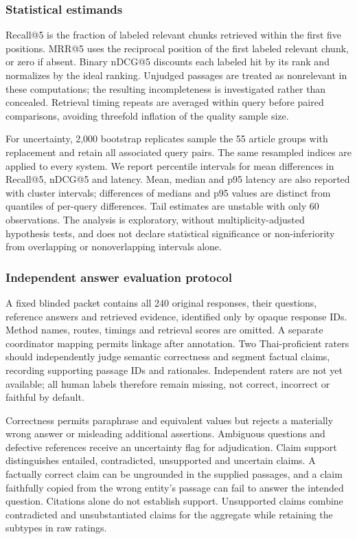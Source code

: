 \hypertarget{statistical-estimands}{%
\subsubsection{Statistical estimands}\label{statistical-estimands}}

Recall@5 is the fraction of labeled relevant chunks retrieved within the
first five positions. MRR@5 uses the reciprocal position of the first
labeled relevant chunk, or zero if absent. Binary nDCG@5 discounts each
labeled hit by its rank and normalizes by the ideal ranking. Unjudged
passages are treated as nonrelevant in these computations; the resulting
incompleteness is investigated rather than concealed. Retrieval timing
repeats are averaged within query before paired comparisons, avoiding
threefold inflation of the quality sample size.

For uncertainty, 2,000 bootstrap replicates sample the 55 article groups
with replacement and retain all associated query pairs. The same
resampled indices are applied to every system. We report percentile
intervals for mean differences in Recall@5, nDCG@5 and latency. Mean,
median and p95 latency are also reported with cluster intervals;
differences of medians and p95 values are distinct from quantiles of
per-query differences. Tail estimates are unstable with only 60
observations. The analysis is exploratory, without multiplicity-adjusted
hypothesis tests, and does not declare statistical significance or
non-inferiority from overlapping or nonoverlapping intervals alone.

\hypertarget{independent-answer-evaluation-protocol}{%
\subsubsection{Independent answer evaluation
protocol}\label{independent-answer-evaluation-protocol}}

A fixed blinded packet contains all 240 original responses, their
questions, reference answers and retrieved evidence, identified only by
opaque response IDs. Method names, routes, timings and retrieval scores
are omitted. A separate coordinator mapping permits linkage after
annotation. Two Thai-proficient raters should independently judge
semantic correctness and segment factual claims, recording supporting
passage IDs and rationales. Independent raters are not yet available;
all human labels therefore remain missing, not correct, incorrect or
faithful by default.

Correctness permits paraphrase and equivalent values but rejects a
materially wrong answer or misleading additional assertions. Ambiguous
questions and defective references receive an uncertainty flag for
adjudication. Claim support distinguishes entailed, contradicted,
unsupported and uncertain claims. A factually correct claim can be
ungrounded in the supplied passages, and a claim faithfully copied from
the wrong entity's passage can fail to answer the intended question.
Citations alone do not establish support. Unsupported claims combine
contradicted and unsubstantiated claims for the aggregate while
retaining the subtypes in raw ratings.

